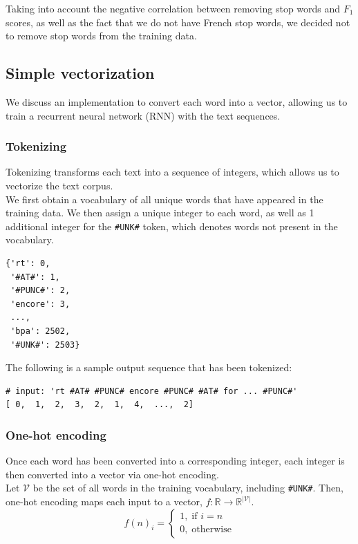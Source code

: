 \documentclass{article}
\numberwithin{equation}{section}
\begin{document}
Taking into account the negative correlation between removing stop words and $F_1$ scores, as well as the fact that we do not have French stop words, we decided not to remove stop words from the training data.


\subsection{Simple vectorization}
We discuss an implementation to convert each word into a vector, allowing us to train a recurrent neural network (RNN) with the text sequences.

\subsubsection{Tokenizing}
Tokenizing transforms each text into a sequence of integers, which allows us to vectorize the text corpus.\\

We first obtain a vocabulary of all unique words that have appeared in the training data.  We then assign a unique integer to each word, as well as 1 additional integer for the \lstinline{#UNK#} token, which denotes words not present in the vocabulary.

\begin{verbatim}
{'rt': 0,
 '#AT#': 1,
 '#PUNC#': 2,
 'encore': 3,
 ...,
 'bpa': 2502,
 '#UNK#': 2503}
\end{verbatim}

The following is a sample output sequence that has been tokenized:
\begin{verbatim}
# input: 'rt #AT# #PUNC# encore #PUNC# #AT# for ... #PUNC#'
[ 0,  1,  2,  3,  2,  1,  4,  ...,  2]
\end{verbatim}

\subsubsection{One-hot encoding}
Once each word has been converted into a corresponding integer, each integer is then converted into a vector via one-hot encoding.\\

Let $\mathcal{V}$ be the set of all words in the training vocabulary, including \lstinline{#UNK#}. Then, one-hot encoding maps each input to a vector, $f: \mathbb{R} \rightarrow \mathbb{R}^{|\mathcal{V}|}$.
	$$ f(n)_i = \left\{\begin{matrix}
	1, \; \text{if } i=n\\
	0, \; \text{otherwise}
	\end{matrix}\right. $$
\end{document}

